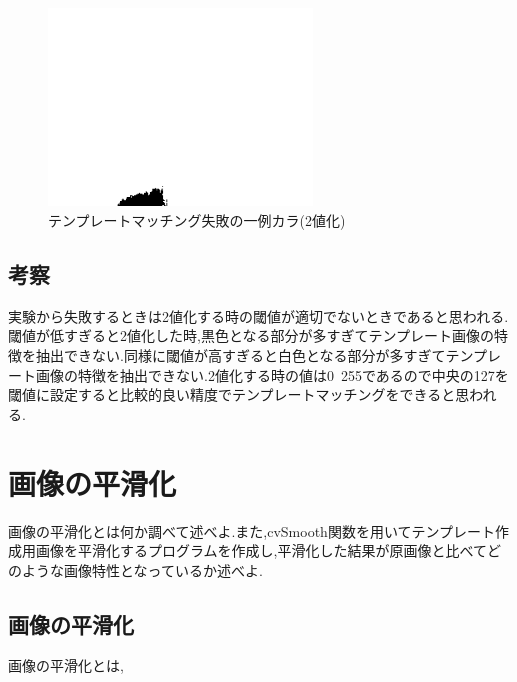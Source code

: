 \documentclass{jarticle}
\begin{document}
\begin{figure}[H]
\begin{center}
\includegraphics[width=7.0cm]{cv_kadai02/fail-mono.png}
\caption{テンプレートマッチング失敗の一例カラ(2値化)}
\label{fig:cvkadai02-fail-mono}
\end{center}
\end{figure}

\subsection{考察}
実験から失敗するときは2値化する時の閾値が適切でないときであると思われる.閾値が低すぎると2値化した時,黒色となる部分が多すぎてテンプレート画像の特徴を抽出できない.同様に閾値が高すぎると白色となる部分が多すぎてテンプレート画像の特徴を抽出できない.2値化する時の値は0~255であるので中央の127を閾値に設定すると比較的良い精度でテンプレートマッチングをできると思われる.

\section{画像の平滑化}
画像の平滑化とは何か調べて述べよ.また,cvSmooth関数を用いてテンプレート作成用画像を平滑化するプログラムを作成し,平滑化した結果が原画像と比べてどのような画像特性となっているか述べよ.

\subsection{画像の平滑化}
画像の平滑化とは,
\end{document}
